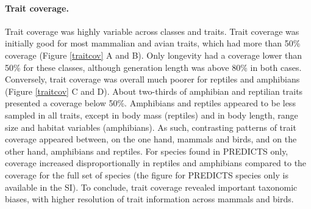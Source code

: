 \paragraph{Trait coverage.}
Trait coverage was highly variable across classes and traits. Trait coverage was initially good for most mammalian and avian traits, which had more than 50\% coverage (Figure \ref{traitcov} A and B). Only longevity had a coverage lower than 50\% for these classes, although generation length was above 80\% in both cases. Conversely, trait coverage was overall much poorer for reptiles and amphibians (Figure \ref{traitcov} C and D). About two-thirds of amphibian and reptilian traits presented a coverage below 50\%.  Amphibians and reptiles appeared to be less sampled in all traits, except in body mass (reptiles) and in body length, range size and habitat variables (amphibians).  As such, contrasting patterns of trait coverage appeared between, on the one hand, mammals and birds, and on the other hand, amphibians and reptiles. For species found in PREDICTS only, coverage increased disproportionally in reptiles and amphibians compared to the coverage for the full set of species (the figure for PREDICTS species only is available in the SI). To conclude, trait coverage revealed important taxonomic biases, with higher resolution of trait information across mammals and birds.


